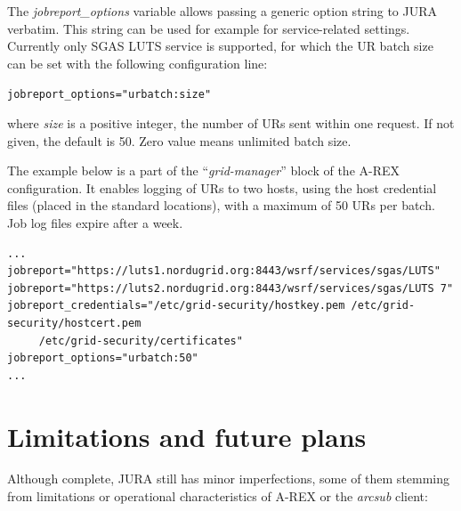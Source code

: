 \documentclass{article}                            %
\begin{document}
The \textit{jobreport\_options} variable allows passing a generic
option string to JURA verbatim. This string can be used for example
for service-related settings. Currently only SGAS LUTS service is
supported, for which the UR batch size can be set with the following
configuration line:

\verb|jobreport_options="urbatch:size"|

where \textit{size} is a positive integer, the number of URs sent
within one request. If not given, the default is 50. Zero value means
unlimited batch size.

The example below is a part of the ``\textit{grid-manager}'' block of
the A-REX configuration. It enables logging of URs to two hosts, using
the host credential files (placed in the standard locations), with a
maximum of 50 URs per batch. Job log files expire after a week.
\begin{verbatim}
...
jobreport="https://luts1.nordugrid.org:8443/wsrf/services/sgas/LUTS"
jobreport="https://luts2.nordugrid.org:8443/wsrf/services/sgas/LUTS 7"
jobreport_credentials="/etc/grid-security/hostkey.pem /etc/grid-security/hostcert.pem 
     /etc/grid-security/certificates"
jobreport_options="urbatch:50"
...
\end{verbatim}


\section{Limitations and future plans}
\label{future}
Although complete, JURA still has minor imperfections, some of them
stemming from limitations or operational characteristics of A-REX or
the \textit{arcsub} client:
\end{document}
